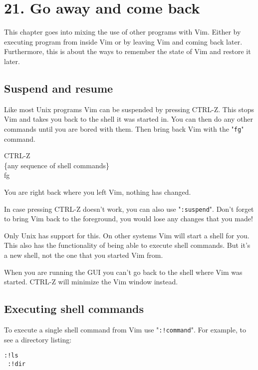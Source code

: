 \section{21. Go away and come back}
This chapter goes into mixing the use of other programs with Vim.
Either by executing program from inside Vim or by leaving Vim and coming back later.
Furthermore, this is about the ways to remember the state of Vim and restore it later.
\localtableofcontents
\subsection{Suspend and resume}
Like most Unix programs Vim can be suspended by pressing CTRL-Z.
This stops Vim and takes you back to the shell it was started in.
You can then do any other commands until you are bored with them.
Then bring back Vim with the "\texttt{fg}" command.

 CTRL-Z\\
 \{any sequence of shell commands\}\\
 fg

You are right back where you left Vim, nothing has changed.

In case pressing CTRL-Z doesn't work, you can also use "\texttt{:suspend}".
Don't forget to bring Vim back to the foreground, you would lose any changes that you made!

Only Unix has support for this.
On other systems Vim will start a shell for you.
This also has the functionality of being able to execute shell commands.
But it's a new shell, not the one that you started Vim from.

When you are running the GUI you can't go back to the shell where Vim was started.
CTRL-Z will minimize the Vim window instead.
\subsection{Executing shell commands}
To execute a single shell command from Vim use "\texttt{:!{command}}".
For example, to see a directory listing:

\begin{Verbatim}[samepage=true]
 :!ls
 :!dir
\end{Verbatim}

